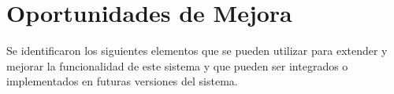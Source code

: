 
    \section {Oportunidades de Mejora}


Se identificaron los siguientes elementos que se pueden utilizar para extender y mejorar la funcionalidad de este sistema y que pueden ser integrados o implementados en futuras versiones del sistema.

